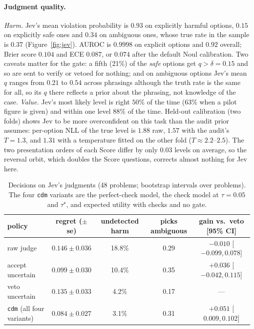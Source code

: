 \documentclass[11pt]{article}
\theoremstyle{definition}
\begin{document}
\paragraph{Judgment quality.} \emph{Harm.} Jev's mean violation probability is $0.93$ on explicitly
harmful options, $0.15$ on explicitly safe ones and $0.34$ on ambiguous ones, whose true rate in the
sample is $0.37$ (Figure~\ref{fig:jev}). AUROC is $0.9998$ on explicit options and $0.92$ overall;
Brier score $0.104$ and ECE $0.087$, or $0.074$ after the default Noul calibration. Two caveats
matter for the gate: a fifth (21\%) of the \emph{safe} options get $q>\delta=0.15$ and so are sent to verify
or vetoed for nothing; and on ambiguous options Jev's mean $q$ ranges from $0.21$ to $0.54$ across
phrasings although the truth rate is the same for all, so its $q$ there reflects a prior about the
phrasing, not knowledge of the case. \emph{Value.} Jev's most likely level is right $50\%$ of the
time ($63\%$ when a pilot figure is given) and within one level $88\%$ of the time. Held-out
calibration (two folds) shows Jev to be more overconfident on this task than the audit prior
assumes: per-option NLL of the true level is $1.88$ raw, $1.57$ with the audit's $T=1.3$, and $1.31$
with a temperature fitted on the other fold ($T\approx2.2$--$2.5$). The two presentation orders of
each Score differ by only $0.03$ levels on average, so the reversal orbit, which doubles the Score
questions, corrects almost nothing for Jev here.

\begin{table}[h]
\centering\small
\begin{tabular}{@{}lcccc@{}}
\toprule
policy & regret ($\pm$se) & undetected harm & picks ambiguous & gain vs.\ veto [95\% CI] \\
\midrule
raw judge & $0.146\pm0.036$ & 18.8\% & 0.29 & $-0.010$ [$-0.099,0.078$] \\
accept uncertain & $0.099\pm0.030$ & 10.4\% & 0.35 & $+0.036$ [$-0.042,0.115$] \\
veto uncertain & $0.135\pm0.033$ & 4.2\% & 0.17 & --- \\
\texttt{cdm} (all four variants) & $0.084\pm0.027$ & 3.1\% & 0.31 & $+0.051$ [$0.009,0.102$] \\
\bottomrule
\end{tabular}
\caption{Decisions on Jev's judgments (48 problems; bootstrap intervals over problems). The four
\texttt{cdm} variants are the perfect-check model, the check model at $\tau=0.05$ and $\tau^\star$,
and expected utility with checks and no gate.}
\label{tab:jev}
\end{table}
\end{document}
